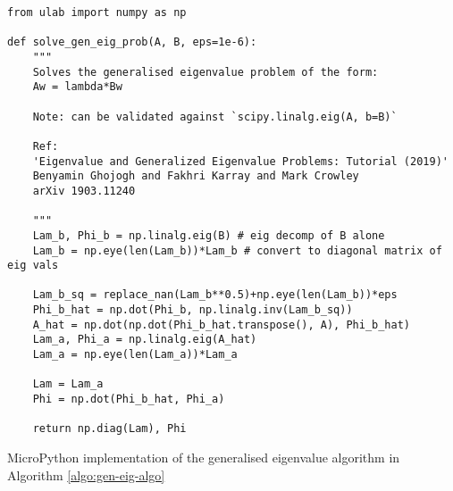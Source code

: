 \begin{listing}[h]
\small
\begin{verbatim}
from ulab import numpy as np

def solve_gen_eig_prob(A, B, eps=1e-6):
    """
    Solves the generalised eigenvalue problem of the form:
    Aw = lambda*Bw
    
    Note: can be validated against `scipy.linalg.eig(A, b=B)`
    
    Ref: 
    'Eigenvalue and Generalized Eigenvalue Problems: Tutorial (2019)'
    Benyamin Ghojogh and Fakhri Karray and Mark Crowley
    arXiv 1903.11240

    """
    Lam_b, Phi_b = np.linalg.eig(B) # eig decomp of B alone
    Lam_b = np.eye(len(Lam_b))*Lam_b # convert to diagonal matrix of eig vals
    
    Lam_b_sq = replace_nan(Lam_b**0.5)+np.eye(len(Lam_b))*eps
    Phi_b_hat = np.dot(Phi_b, np.linalg.inv(Lam_b_sq))
    A_hat = np.dot(np.dot(Phi_b_hat.transpose(), A), Phi_b_hat)
    Lam_a, Phi_a = np.linalg.eig(A_hat)
    Lam_a = np.eye(len(Lam_a))*Lam_a
    
    Lam = Lam_a
    Phi = np.dot(Phi_b_hat, Phi_a)
    
    return np.diag(Lam), Phi

\end{verbatim}
\caption{MicroPython implementation of the generalised eigenvalue algorithm in Algorithm \ref{algo:gen-eig-algo}}
\label{app-listing:gen-eig-prob-mpy}
\end{listing}
